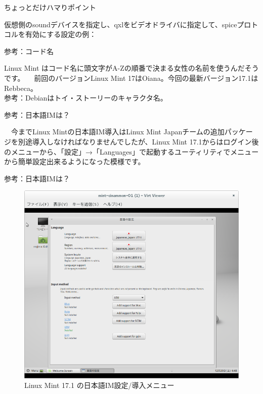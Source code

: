 \begin{frame}[containsverbatim]{ちょっとだけハマりポイント}

 仮想側のsoundデバイスを指定し、qxlをビデオドライバに指定して、spiceプロトコルを有効にする設定の例：
  

\end{frame}


\begin{frame}{参考：コード名}

  Linux Mint はコード名に頭文字がA-Zの順番で決まる女性の名前を使うんだそうです。
　前回のバージョンLinux Mint 17はOiana。今回の最新バージョン17.1はRebbeca。\\
  参考：Debianはトイ・ストーリーのキャラクタ名。

\end{frame}

\begin{frame}{参考：日本語IMは？}

　今までLinux Mintの日本語IM導入はLinux Mint Japanチームの追加パッケージを別途導入しなければなりませんでしたが、Linux Mint 17.1からはログイン後のメニューから、「設定」→「Languages」で起動するユーティリティでメニューから簡単設定出来るようになった模様です。
  
\end{frame}

\begin{frame}{参考：日本語IMは？}

 \begin{figure}[H]
\centering
 \includegraphics[width=0.7\hsize]{image201412/mint-im-setup.png}
\caption{Linux Mint 17.1 の日本語IM設定/導入メニュー}
\end{figure}
  
\end{frame}

